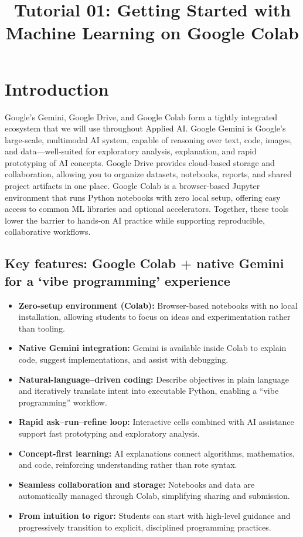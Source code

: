 \documentclass[12pt]{article}
\begin{document}
\doublespacing

\title{Tutorial 01: Getting Started with Machine Learning on Google Colab}
\author{}
\date{}

\maketitle

\section*{Introduction}
Google's Gemini, Google Drive, and Google Colab form a tightly integrated ecosystem that we will use throughout Applied AI. Google Gemini is Google’s large-scale, multimodal AI system, capable of reasoning over text, code, images, and data—well-suited for exploratory analysis, explanation, and rapid prototyping of AI concepts. Google Drive provides cloud-based storage and collaboration, allowing you to organize datasets, notebooks, reports, and shared project artifacts in one place. Google Colab is a browser-based Jupyter environment that runs Python notebooks with zero local setup, offering easy access to common ML libraries and optional accelerators. Together, these tools lower the barrier to hands-on AI practice while supporting reproducible, collaborative workflows.

\subsection*{Key features: Google Colab + native Gemini for a `vibe programming' experience}

\begin{itemize}
  \item \textbf{Zero-setup environment (Colab):} Browser-based notebooks with no local installation, allowing students to focus on ideas and experimentation rather than tooling.
  \item \textbf{Native Gemini integration:} Gemini is available inside Colab to explain code, suggest implementations, and assist with debugging.
  \item \textbf{Natural-language–driven coding:} Describe objectives in plain language and iteratively translate intent into executable Python, enabling a ``vibe programming'' workflow.
  \item \textbf{Rapid ask--run--refine loop:} Interactive cells combined with AI assistance support fast prototyping and exploratory analysis.
  \item \textbf{Concept-first learning:} AI explanations connect algorithms, mathematics, and code, reinforcing understanding rather than rote syntax.
  \item \textbf{Seamless collaboration and storage:} Notebooks and data are automatically managed through Colab, simplifying sharing and submission.
  \item \textbf{From intuition to rigor:} Students can start with high-level guidance and progressively transition to explicit, disciplined programming practices.
\end{itemize}
\end{document}
